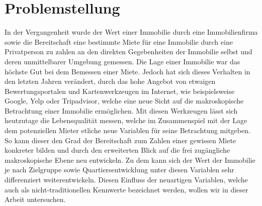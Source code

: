\section{Problemstellung}
In der Vergangenheit wurde der Wert einer Immobilie durch eine 
Immobilienfirma sowie die Bereitschaft eine bestimmte Miete für 
eine Immobilie durch eine Privatperson zu zahlen an den direkten 
Gegebenheiten der Immobilie selbst und deren unmittelbarer Umgebung 
gemessen. Die Lage einer Immobilie war das höchste Gut bei dem 
Bemessen einer Miete. Jedoch hat sich dieses Verhalten in den 
letzten Jahren verändert, durch das hohe Angebot von etwaigen 
Bewertungsportalen und Kartenwerkzeugen im Internet, wie 
beispielsweise Google, Yelp oder Tripadvisor, welche eine neue 
Sicht auf die makroskopische Betrachtung einer Immobilie 
ermöglichen. Mit diesen Werkzeugen lässt sich heutzutage die 
Lebensqualität messen, welche im Zusammenspiel mit der Lage dem 
potenziellen Mieter etliche neue Variablen für seine Betrachtung 
mitgeben. So kann dieser den Grad der Bereitschaft zum Zahlen einer 
gewissen Miete konkreter bilden und durch den erweiterten Blick auf 
die frei zugängliche makroskopische Ebene neu entwickeln. Zu dem 
kann sich der Wert der Immobilie je nach Zielgruppe sowie 
Quartiersentwicklung unter diesen Variablen sehr differenziert 
weiterentwickeln. Diesen Einfluss der neuartigen Variablen, 
welche auch als nicht-traditionellen Kennwerte bezeichnet werden, 
wollen wir in dieser Arbeit untersuchen.
